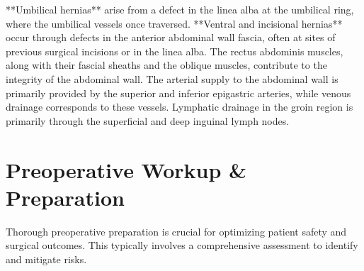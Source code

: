 **Umbilical hernias** arise from a defect in the linea alba at the umbilical ring, where the umbilical vessels once traversed. **Ventral and incisional hernias** occur through defects in the anterior abdominal wall fascia, often at sites of previous surgical incisions or in the linea alba. The rectus abdominis muscles, along with their fascial sheaths and the oblique muscles, contribute to the integrity of the abdominal wall. The arterial supply to the abdominal wall is primarily provided by the superior and inferior epigastric arteries, while venous drainage corresponds to these vessels. Lymphatic drainage in the groin region is primarily through the superficial and deep inguinal lymph nodes.

\section*{Preoperative Workup \& Preparation}
Thorough preoperative preparation is crucial for optimizing patient safety and surgical outcomes. This typically involves a comprehensive assessment to identify and mitigate risks.

